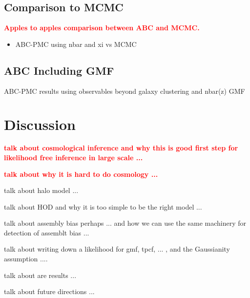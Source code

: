 \documentclass[12pt, preprint]{aastex}
\newcommand{\todo}[1]{{\bf \textcolor{red}{ #1}}}
\begin{document}
\subsection{Comparison to MCMC}
\todo{Apples to apples comparison between ABC and MCMC.}
\begin{itemize}
\item ABC-PMC using nbar and xi vs MCMC
\cite{Ishida:2015aa}
\end{itemize}

\subsection{ABC Including GMF}
ABC-PMC results using observables beyond galaxy clustering and nbar(z) GMF

\section{Discussion}\label{sec:discussion}
\todo{talk about cosmological inference and why this is good first step for likelihood free inference in large scale ...}

\todo{talk about why it is hard to do cosmology ...}

talk about halo model ...

talk about HOD and why it is too simple to be the right model ...

talk about assembly bias perhaps ... and how we can use the same machinery for detection of assemblt bias ... 

talk about writing down a likelihood for gmf, tpcf, ... , and the Gaussianity assumption ....

talk about are results ...


talk about future directions ...


\end{document}
